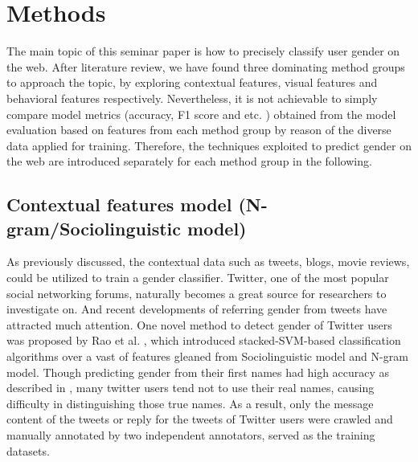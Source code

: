 \documentclass[runningheads]{llncs}
\begin{document}
	
	\section{Methods}
	
	The main topic of this seminar paper is how to precisely classify user gender on the web. After literature review, we have found three dominating method groups to approach the topic, by exploring contextual features, visual features and behavioral features respectively. Nevertheless, it is not achievable to simply compare model metrics (accuracy, F1 score and etc. ) obtained from the model evaluation based on features from each method group by reason of the diverse data applied for training. Therefore, the techniques exploited to predict gender on the web are introduced separately for each method group in the following. 
	
	\subsection{Contextual features model (N-gram/Sociolinguistic model)}
	
	As previously discussed, the contextual data such as tweets, blogs, movie reviews, could be utilized to train a gender classifier. Twitter, one of the most popular social networking forums, naturally becomes a great source for researchers to investigate on. And recent developments of referring gender from tweets have attracted much attention. One novel method to detect gender of Twitter users was proposed by Rao et al. \cite{rao2010classifying}, which introduced stacked-SVM-based classification algorithms over a vast of features gleaned from Sociolinguistic model and N-gram model. 
	Though predicting gender from their first names had high accuracy as described in \cite{karimi2016inferring}, many twitter users tend not to use their real names, causing difficulty in distinguishing those true names. As a result, only the message content of the tweets or reply for the tweets of Twitter users were crawled and manually annotated by two independent annotators, served as the training datasets.  \\
	
\end{document}
